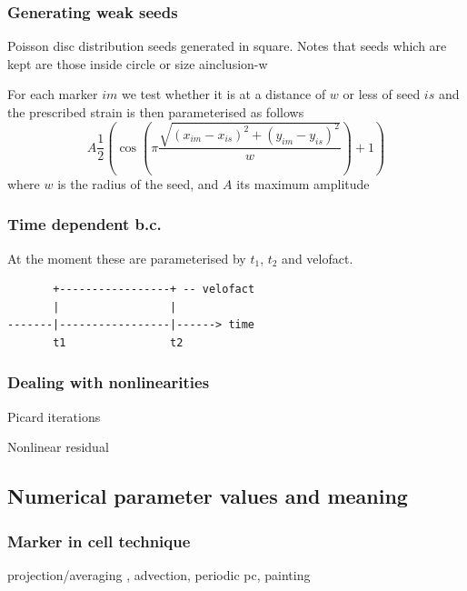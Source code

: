 \documentclass[a4paper]{article}
\begin{document}
\subsubsection{Generating weak seeds}

Poisson disc distribution
seeds generated in square.
Notes that seeds which are kept are those inside circle or size ainclusion-w

For each marker $im$ we test whether it is at a distance of $w$ or less of 
seed $is$ and the prescribed strain is then parameterised as follows
\[
A \frac{1}{2} \left(\cos (\pi \frac{\sqrt{(x_{im}-x_{is})^2+(y_{im}-y_{is})^2}}{w}) +1 \right)
\]
where $w$ is the radius of the seed, and $A$ its maximum amplitude




\subsubsection{Time dependent b.c.}

At the moment these are parameterised by $t_1$, $t_2$ and velofact.

\begin{verbatim}
       +-----------------+ -- velofact
       |                 |
-------|-----------------|------> time
       t1                t2
\end{verbatim}



\subsubsection{Dealing with nonlinearities}

Picard iterations

Nonlinear residual


\subsection{Numerical parameter values and meaning}


\subsubsection{Marker in cell technique}

projection/averaging , advection, periodic pc, painting
\end{document}

